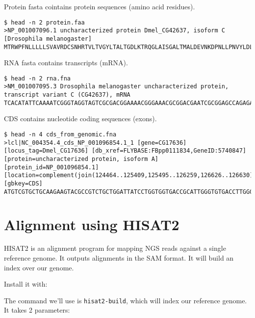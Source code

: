 Protein fasta cointains protein sequences (amino acid residues).

\begin{verbatim}
$ head -n 2 protein.faa
>NP_001007096.1 uncharacterized protein Dmel_CG42637, isoform C [Drosophila melanogaster]
MTRWPFNLLLLLSVAVRDCSNHRTVLTVGYLTALTGDLKTRQGLAISGALTMALDEVNKDPNLLPNVYLDLRWNDTKGDT
\end{verbatim}

RNA fasta contains transcripts (mRNA).

\begin{verbatim}
$ head -n 2 rna.fna
>NM_001007095.3 Drosophila melanogaster uncharacterized protein, transcript variant C (CG42637), mRNA
TCACATATTCAAAATCGGGTAGGTAGTCGCGACGGAAAACGGGAAACGCGGACGAATCGCGGAGCCAGAGAAGCGGTAAA
\end{verbatim}

CDS contains nucleotide coding sequences (exons).

\begin{verbatim}
$ head -n 4 cds_from_genomic.fna
>lcl|NC_004354.4_cds_NP_001096854.1_1 [gene=CG17636] [locus_tag=Dmel_CG17636] [db_xref=FLYBASE:FBpp0111834,GeneID:5740847] [protein=uncharacterized protein, isoform A] [protein_id=NP_001096854.1] [location=complement(join(124464..125409,125495..126259,126626..126630))] [gbkey=CDS]
ATGTCGTGCTGCAAGAAGTACGCCGTCTGCTGGATTATCCTGGTGGTGACCGCATTGGGTGTGACCTTGGGTCTGGTTTT
\end{verbatim}

\hypertarget{alignment-using-hisat2}{%
\section{Alignment using HISAT2}\label{alignment-using-hisat2}}

HISAT2 is an alignment program for mapping NGS reads against a single
reference genome. It outputs alignments in the SAM format. It will build
an index over our genome.

Install it with:

\begin{Shaded}
\begin{Highlighting}[]
\end{Highlighting}
\end{Shaded}

The command we'll use is \texttt{hisat2-build}, which will index our
reference genome. It takes 2 parameters:

